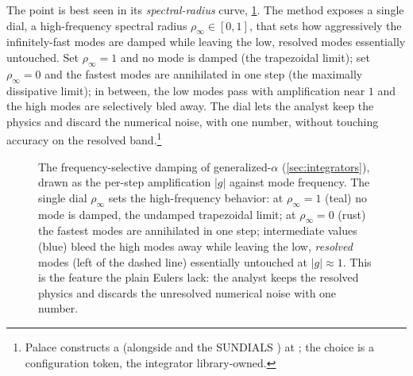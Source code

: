 The point is best seen in its \emph{spectral-radius} curve, \cref{fig:genalpha}.
The method exposes a single dial, a high-frequency spectral radius $\rho_\infty \in
[0,1]$, that sets how aggressively the infinitely-fast modes are damped while
leaving the low, resolved modes essentially untouched. Set $\rho_\infty = 1$ and no
mode is damped (the trapezoidal limit); set $\rho_\infty = 0$ and the
fastest modes are annihilated in one step (the maximally dissipative limit); in
between, the low modes pass with amplification near $1$ and the high modes are
selectively bled away. The dial lets the analyst keep the physics and discard the
numerical noise, with one number, without touching accuracy on the resolved
band.\footnote{Palace constructs a  (alongside
 and the SUNDIALS ) at
; the choice is a configuration token,
the integrator library-owned.}

\begin{figure}[t]
\centering
{}
\caption[Numerical damping of generalized-$\alpha$]{The frequency-selective damping
of generalized-$\alpha$ (\cref{sec:integrators}), drawn as the per-step
amplification $|g|$ against mode frequency. The single dial $\rho_\infty$ sets the
high-frequency behavior: at $\rho_\infty = 1$ (teal) no mode is damped, the
undamped trapezoidal limit; at $\rho_\infty = 0$ (rust) the fastest modes are
annihilated in one step; intermediate values (blue) bleed the high modes away while
leaving the low, \emph{resolved} modes (left of the dashed line) essentially
untouched at $|g|\approx 1$. This is the feature the plain Eulers lack: the analyst
keeps the resolved physics and discards the unresolved numerical noise with one
number.}
\label{fig:genalpha}
\end{figure}

